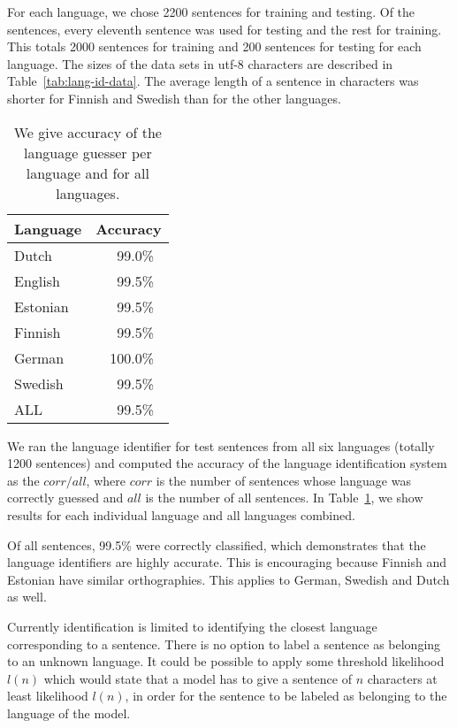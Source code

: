 \documentclass{llncs}
\begin{document}
For each language, we chose 2200 sentences for training and
testing. Of the sentences, every eleventh sentence was used for
testing and the rest for training. This totals 2000 sentences for
training and 200 sentences for testing for each language. The sizes of
the data sets in utf-8 characters are described in
Table~\ref{tab:lang-id-data}. The average length of a sentence in
characters was shorter for Finnish and Swedish than for the other
languages.

\begin{table}
\begin{center}
\begin{tabular}{l|l}
Language & Accuracy\\
\hline
Dutch    & ~~~99.0\%\\
English  & ~~~99.5\%\\
Estonian & ~~~99.5\%\\
Finnish  & ~~~99.5\%\\
German   & ~~100.0\%\\
Swedish  & ~~~99.5\%\\
\hline
ALL      & ~~~99.5\%
\end{tabular}
\caption{We give accuracy of the language guesser per language and for
  all languages.}\label{tab:lang-id-acc}
\end{center}
\end{table}

We ran the language identifier for test sentences from all six
languages (totally 1200 sentences) and computed the accuracy of the
language identification system as the $corr / all$, where $corr$ is
the number of sentences whose language was correctly guessed and $all$
is the number of all sentences. In Table~\ref{tab:lang-id-acc}, we
show results for each individual language and all languages
combined. 

Of all sentences, 99.5\% were correctly classified, which demonstrates
that the language identifiers are highly accurate. This is encouraging
because Finnish and Estonian have similar orthographies. This applies
to German, Swedish and Dutch as well.

Currently identification is limited to identifying the closest
language corresponding to a sentence. There is no option to label a
sentence as belonging to an unknown language. It could be possible to
apply some threshold likelihood $l(n)$ which would state that a model
has to give a sentence of $n$ characters at least likelihood $l(n)$,
in order for the sentence to be labeled as belonging to the language
of the model. 
\end{document}
